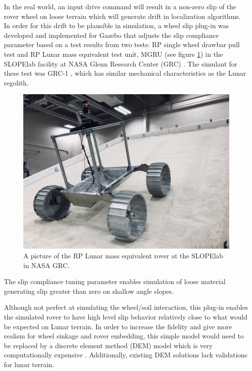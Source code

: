 \documentclass[twocolumn,letterpaper]{IEEEAerospaceCLS}  %
\begin{document}
In the real world, an input drive command will result in a non-zero slip of the rover wheel on loose terrain which will generate drift in localization algorithms.
In order for this drift to be plausible in simulation, a wheel slip plug-in was developed and implemented for Gazebo that adjusts the slip compliance parameter based on a test results from two tests: RP single wheel drawbar pull test and RP Lunar mass equivalent test unit, MGRU (see figure \ref{fig:mgru}) in the SLOPElab facility at NASA Glenn Research Center (GRC) \cite{nasa2018slope}.  
The simulant for these test was GRC-1 \cite{he2010geotechnical}, which has similar mechanical characteristics as the Lunar regolith.
\begin{figure}[h!]
	\includegraphics[width=\columnwidth]{figures/wheel_slip_MGRU.JPG}
   	\caption{A picture of the RP Lunar mass equivalent rover at the SLOPElab in NASA GRC.}
    \label{fig:mgru}
\end{figure}
The slip compliance tuning parameter enables simulation of loose material generating slip greater than zero on shallow angle slopes.

Although not perfect at simulating the wheel/soil interaction, this plug-in enables the simulated rover to have high level slip behavior relatively close to what would be expected on Lunar terrain.  
In order to increase the fidelity and give more realism for wheel sinkage and rover embedding, this simple model would need to be replaced by a discrete element method (DEM) model which is very computationally expensive \cite{soni2012dem}.  Additionally, existing DEM solutions lack validations for lunar terrain.
\end{document}
